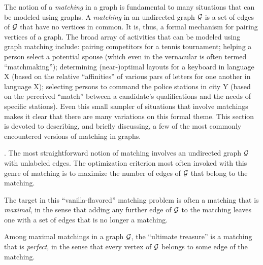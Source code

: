 The notion of a {\it matching} in a graph is fundamental to many
situations that can be modeled using graphs.  A {\it matching} in an
undirected graph $\mbox{$\cal G$}$ is a set of edges of $\mbox{$\cal G$}$ that have no vertices in
common.  It is, thus, a formal mechanism for pairing vertices of a graph.
The broad array of activities that can be modeled using graph matching
include: pairing competitors for a tennis tournament; helping a person
select a potential spouse (which even in the vernacular is often
termed ``matchmaking''); determining (near-)optimal layouts for a
keyboard in language X (based on the relative ``affinities'' of
various pars of letters for one another in language X); selecting
persons to command the police stations in city Y (based on the
perceived ``match'' between a candidate's qualifications and the needs
of specific stations).  Even this small sampler of situations that
involve matchings makes it clear that there are many variations on
this formal theme.  This section is devoted to describing, and briefly
discussing, a few of the most commonly encountered versions of
matching in graphs.
\bigskip

\noindent {}
\bigskip

.
The most straightforward notion of matching involves an undirected
graph $\mbox{$\cal G$}$ with unlabeled edges.  The optimization criterion most
often invoked with this genre of matching is to maximize the number of
edges of $\mbox{$\cal G$}$ that belong to the matching.

The target in this ``vanilla-flavored'' matching problem is often a
matching that is {\em maximal}, 
 in the sense that
adding any further edge of $\mbox{$\cal G$}$ to the matching leaves one with a set
of edges that is no longer a matching.

Among maximal matchings in a graph $\mbox{$\cal G$}$, the ``ultimate treasure'' is
a matching that is {\it perfect},  in
the sense that every vertex of $\mbox{$\cal G$}$ belongs to some edge of the matching.

